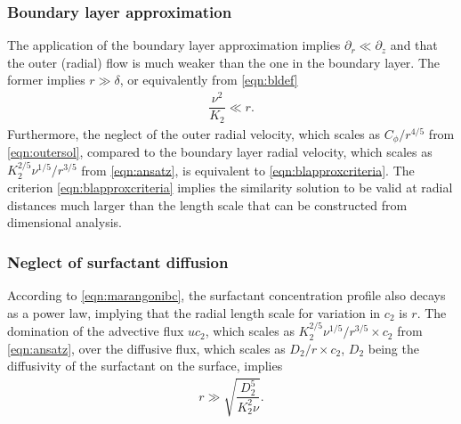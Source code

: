 \documentclass[]{jfm}
\begin{document}
\subsubsection{Boundary layer approximation}
The application of the boundary layer approximation implies $\partial_r \ll \partial_z$ and that the outer (radial) flow is much weaker than the one in the boundary layer.
The former implies $r \gg \delta$, or equivalently from \eqref{eqn:bldef}
\begin{align}
\dfrac{\nu^2}{K_2} \ll r.
\label{eqn:blapproxcriteria}
\end{align}
Furthermore, the neglect of the outer radial velocity, which scales as $C_\phi/r^{4/5}$ from \eqref{eqn:outersol}, compared to the boundary layer radial velocity, which scales as ${K_2^{2/5} \nu^{1/5}}/{r^{3/5}}$ from \eqref{eqn:ansatz}, is equivalent to \eqref{eqn:blapproxcriteria}.
The criterion \eqref{eqn:blapproxcriteria} implies the similarity solution to be valid at radial distances much larger than the length scale that can be constructed from dimensional analysis.
% 

\subsubsection{Neglect of surfactant diffusion}
According to \eqref{eqn:marangonibc}, the surfactant concentration profile also decays as a power law, implying that the radial length scale for variation in $c_2$ is $r$.
The domination of the advective flux $uc_2$, which scales as ${K_2^{2/5} \nu^{1/5}}/{r^{3/5}} \times c_2$ from \eqref{eqn:ansatz}, over the diffusive flux, which scales as $D_2/r \times c_2$, $D_2$ being the diffusivity of the surfactant on the surface, implies
\begin{align}
r \gg \sqrt{\dfrac{D_2^5}{K_2^2 \nu}}.
\end{align}
\end{document}
